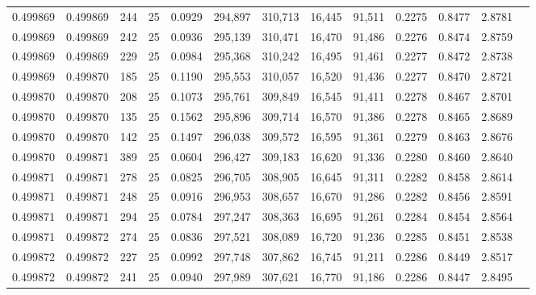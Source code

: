 \begin{tabular}{rrrrrrrrrrrrr}
0.499869 & 0.499869 &   244 &  25 &                                     0.0929 & 294,897 & 310,713 &  16,445 &  91,511 & 0.2275 & 0.8477 & 2.8781 \\
0.499869 & 0.499869 &   242 &  25 &                                     0.0936 & 295,139 & 310,471 &  16,470 &  91,486 & 0.2276 & 0.8474 & 2.8759 \\
0.499869 & 0.499869 &   229 &  25 &                                     0.0984 & 295,368 & 310,242 &  16,495 &  91,461 & 0.2277 & 0.8472 & 2.8738 \\
0.499869 & 0.499870 &   185 &  25 &                                     0.1190 & 295,553 & 310,057 &  16,520 &  91,436 & 0.2277 & 0.8470 & 2.8721 \\
0.499870 & 0.499870 &   208 &  25 &                                     0.1073 & 295,761 & 309,849 &  16,545 &  91,411 & 0.2278 & 0.8467 & 2.8701 \\
0.499870 & 0.499870 &   135 &  25 &                                     0.1562 & 295,896 & 309,714 &  16,570 &  91,386 & 0.2278 & 0.8465 & 2.8689 \\
0.499870 & 0.499870 &   142 &  25 &                                     0.1497 & 296,038 & 309,572 &  16,595 &  91,361 & 0.2279 & 0.8463 & 2.8676 \\
0.499870 & 0.499871 &   389 &  25 &                                     0.0604 & 296,427 & 309,183 &  16,620 &  91,336 & 0.2280 & 0.8460 & 2.8640 \\
0.499871 & 0.499871 &   278 &  25 &                                     0.0825 & 296,705 & 308,905 &  16,645 &  91,311 & 0.2282 & 0.8458 & 2.8614 \\
0.499871 & 0.499871 &   248 &  25 &                                     0.0916 & 296,953 & 308,657 &  16,670 &  91,286 & 0.2282 & 0.8456 & 2.8591 \\
0.499871 & 0.499871 &   294 &  25 &                                     0.0784 & 297,247 & 308,363 &  16,695 &  91,261 & 0.2284 & 0.8454 & 2.8564 \\
0.499871 & 0.499872 &   274 &  25 &                                     0.0836 & 297,521 & 308,089 &  16,720 &  91,236 & 0.2285 & 0.8451 & 2.8538 \\
0.499872 & 0.499872 &   227 &  25 &                                     0.0992 & 297,748 & 307,862 &  16,745 &  91,211 & 0.2286 & 0.8449 & 2.8517 \\
0.499872 & 0.499872 &   241 &  25 &                                     0.0940 & 297,989 & 307,621 &  16,770 &  91,186 & 0.2286 & 0.8447 & 2.8495 \\

\end{tabular}
